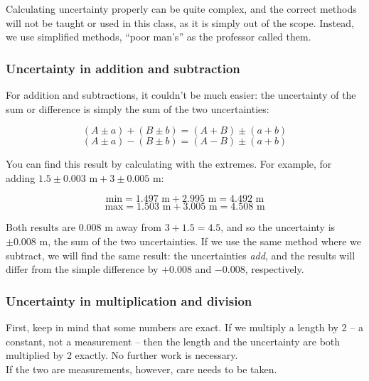 Calculating uncertainty properly can be quite complex, and the correct methods will not be taught or used in this class, as it is simply out of the scope. Instead, we use simplified methods, ``poor man's'' as the professor called them.

\subsubsection{Uncertainty in addition and subtraction}

For addition and subtractions, it couldn't be much easier: the uncertainty of the sum or difference is simply the sum of the two uncertainties:

\begin{equation}
 (A \pm a) + (B \pm b) = (A + B) \pm (a +b)
\end{equation}
\begin{equation}
 (A \pm a) - (B \pm b) = (A - B) \pm (a +b)
\end{equation}

You can find this result by calculating with the extremes. For example, for adding $1.5 \pm 0.003 \text{ m} + 3 \pm 0.005 \text{ m}$:

\begin{equation}
\text{min} = 1.497 \text{ m} + 2.995 \text{ m} = 4.492 \text{ m}
\end{equation}
\begin{equation}
\text{max} = 1.503 \text{ m} + 3.005 \text{ m} = 4.508 \text{ m}
\end{equation}

Both results are $0.008$ m away from $3 + 1.5 = 4.5$, and so the uncertainty is $\pm 0.008$ m, the sum of the two uncertainties.  
If we use the same method where we subtract, we will find the same result: the uncertainties \emph{add}, and the results will differ from the simple difference by $+0.008$ and $-0.008$, respectively.

\subsubsection{Uncertainty in multiplication and division}

First, keep in mind that some numbers are exact. If we multiply a length by 2 -- a constant, not a measurement -- then the length and the uncertainty are both multiplied by 2 exactly. No further work is necessary.\\
If the two are measurements, however, care needs to be taken.

